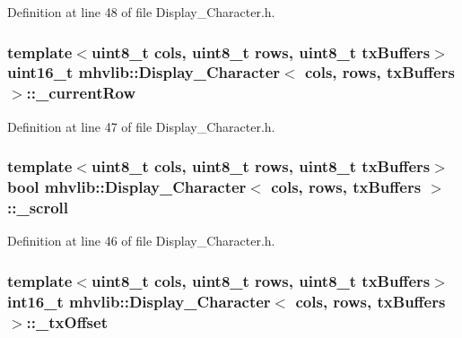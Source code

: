 Definition at line 48 of file Display\-\_\-\-Character.\-h.

\hypertarget{classmhvlib_1_1_display___character_a6e99a9d6f438c7f576f9b7fc57d1a386}{
\subsubsection[{\-\_\-current\-Row}]{\setlength{\rightskip}{0pt plus 5cm}template$<$uint8\-\_\-t cols, uint8\-\_\-t rows, uint8\-\_\-t tx\-Buffers$>$ uint16\-\_\-t {\bf mhvlib\-::\-Display\-\_\-\-Character}$<$ cols, rows, tx\-Buffers $>$\-::\-\_\-current\-Row\hspace{0.3cm}{\ttfamily [protected]}}}\label{classmhvlib_1_1_display___character_a6e99a9d6f438c7f576f9b7fc57d1a386}


Definition at line 47 of file Display\-\_\-\-Character.\-h.

\hypertarget{classmhvlib_1_1_display___character_a7cca385d4236d082091311f9c295b167}{
\subsubsection[{\-\_\-scroll}]{\setlength{\rightskip}{0pt plus 5cm}template$<$uint8\-\_\-t cols, uint8\-\_\-t rows, uint8\-\_\-t tx\-Buffers$>$ bool {\bf mhvlib\-::\-Display\-\_\-\-Character}$<$ cols, rows, tx\-Buffers $>$\-::\-\_\-scroll\hspace{0.3cm}{\ttfamily [protected]}}}\label{classmhvlib_1_1_display___character_a7cca385d4236d082091311f9c295b167}


Definition at line 46 of file Display\-\_\-\-Character.\-h.

\hypertarget{classmhvlib_1_1_display___character_adf8f97cb0d4d3c8972fae1b6193484ad}{
\subsubsection[{\-\_\-tx\-Offset}]{\setlength{\rightskip}{0pt plus 5cm}template$<$uint8\-\_\-t cols, uint8\-\_\-t rows, uint8\-\_\-t tx\-Buffers$>$ int16\-\_\-t {\bf mhvlib\-::\-Display\-\_\-\-Character}$<$ cols, rows, tx\-Buffers $>$\-::\-\_\-tx\-Offset\hspace{0.3cm}{\ttfamily [protected]}}}\label{classmhvlib_1_1_display___character_adf8f97cb0d4d3c8972fae1b6193484ad}


